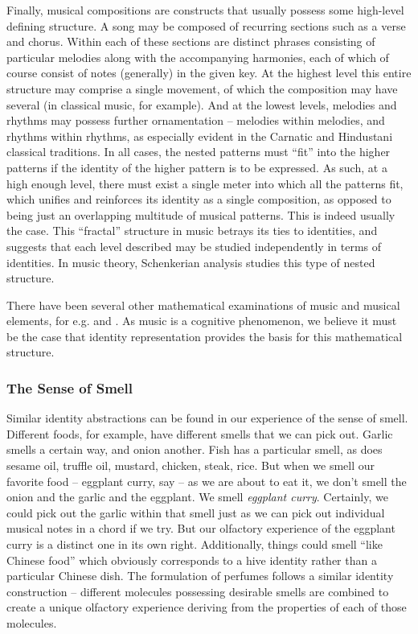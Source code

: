 \documentclass[pra,twocolumn,groupedaddress,10pt]{revtex4}
\theoremstyle{definition}
\begin{document}
Finally, musical compositions are constructs that usually possess some high-level defining structure. A song may be composed of recurring sections such as a verse and chorus. Within each of these sections are distinct phrases consisting of particular melodies along with the accompanying harmonies, each of which of course consist of notes (generally) in the given key. At the highest level this entire structure may comprise a single movement, of which the composition may have several (in classical music, for example). And at the lowest levels, melodies and rhythms may possess further ornamentation -- melodies within melodies, and rhythms within rhythms, as especially evident in the Carnatic and Hindustani classical traditions. In all cases, the nested patterns must ``fit'' into the higher patterns if the identity of the higher pattern is to be expressed. As such, at a high enough level, there must exist a single meter into which all the patterns fit, which unifies and reinforces its identity as a single composition, as opposed to being just an overlapping multitude of musical patterns. This is indeed usually the case. This ``fractal'' structure in music betrays its ties to identities, and suggests that each level described may be studied independently in terms of identities. In music theory, Schenkerian analysis\cite{schenker} studies this type of nested structure.

There have been several other mathematical examinations of music and musical elements, for e.g. \cite{musicmath} and \cite{musselfsim}. As music is a cognitive phenomenon, we believe it must be the case that identity representation provides the basis for this mathematical structure.

\subsubsection{The Sense of Smell} \label{sec:sensme}

Similar identity abstractions can be found in our experience of the sense of smell. Different foods, for example, have different smells that we can pick out. Garlic smells a certain way, and onion another. Fish has a particular smell, as does sesame oil, truffle oil, mustard, chicken, steak, rice. But when we smell our favorite food -- eggplant curry, say -- as we are about to eat it, we don't smell the onion and the garlic and the eggplant. We smell \textit{eggplant curry}. Certainly, we could pick out the garlic within that smell just as we can pick out individual musical notes in a chord if we try. But our olfactory experience of the eggplant curry is a distinct one in its own right. Additionally, things could smell ``like Chinese food'' which obviously corresponds to a hive identity rather than a particular Chinese dish. The formulation of perfumes follows a similar identity construction -- different molecules possessing desirable smells are combined to create a unique olfactory experience deriving from the properties of each of those molecules\cite{smellmolecules}.
\end{document}
